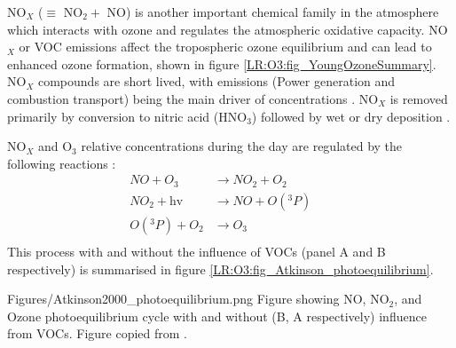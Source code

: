     NO$_X$ ($\equiv $ NO$_2 +$ NO) is another important chemical family in the atmosphere which interacts with ozone and regulates the atmospheric oxidative capacity.
    NO$_X$ or VOC emissions affect the tropospheric ozone equilibrium and can lead to enhanced ozone formation, shown in figure \ref{LR:O3:fig_YoungOzoneSummary}.
    NO$_X$ compounds are short lived, with emissions (Power generation and combustion transport) being the main driver of concentrations \parencite{Delmas1997}.
    NO$_X$ is removed primarily by conversion to nitric acid (HNO$_3$) followed by wet or dry deposition \parencite{Ayers2006}.
    
    NO$_X$ and O$_3$ relative concentrations during the day are regulated by the following reactions \parencite{Sillman1999,Atkinson2000}:
    \begin{equation}
      \begin{aligned}
        NO + O_3         & \to NO_2 + O_2      && \\%
        NO_2 + \text{hv} & \to NO + O({}^3P)   && \\%
        O({}^3P) + O_2   & \to O_3 			 && \\%
      \end{aligned}
      \label{LR:Atmos:Chem:eqn_NOandO3}
    \end{equation}
    This process with and without the influence of VOCs (panel A and B respectively) is summarised in figure \ref{LR:O3:fig_Atkinson_photoequilibrium}.
    
      {Figures/Atkinson2000_photoequilibrium.png}
      {Figure showing NO, NO$_2$, and Ozone photoequilibrium cycle with and without (B, A respectively) influence from VOCs. Figure copied from \textcite{Atkinson2000}.}
      {\label{LR:O3:fig_Atkinson_photoequilibrium}}
    
    
    
  
